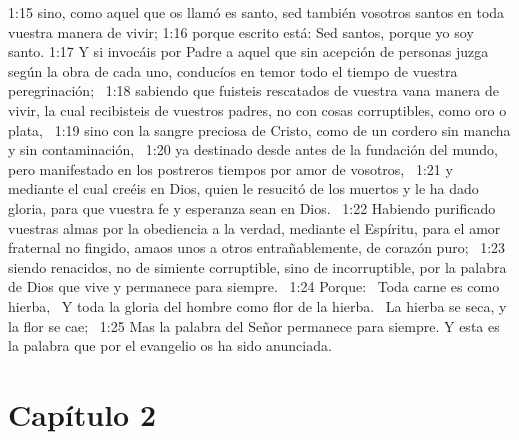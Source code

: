 1:15 sino, como aquel que os llamó es santo, sed también vosotros santos en toda vuestra manera de vivir; 
1:16 porque escrito está: Sed santos, porque yo soy santo. 
1:17 Y si invocáis por Padre a aquel que sin acepción de personas juzga según la obra de cada uno, conducíos en temor todo el tiempo de vuestra peregrinación;  
1:18 sabiendo que fuisteis rescatados de vuestra vana manera de vivir, la cual recibisteis de vuestros padres, no con cosas corruptibles, como oro o plata,  
1:19 sino con la sangre preciosa de Cristo, como de un cordero sin mancha y sin contaminación,  
1:20 ya destinado desde antes de la fundación del mundo, pero manifestado en los postreros tiempos por amor de vosotros,  
1:21 y mediante el cual creéis en Dios, quien le resucitó de los muertos y le ha dado gloria, para que vuestra fe y esperanza sean en Dios.  
1:22 Habiendo purificado vuestras almas por la obediencia a la verdad, mediante el Espíritu, para el amor fraternal no fingido, amaos unos a otros entrañablemente, de corazón puro;  
1:23 siendo renacidos, no de simiente corruptible, sino de incorruptible, por la palabra de Dios que vive y permanece para siempre.  
1:24 Porque:  
Toda carne es como hierba,  
Y toda la gloria del hombre como flor de la hierba.  
La hierba se seca, y la flor se cae;  
1:25 Mas la palabra del Señor permanece para siempre. 
Y esta es la palabra que por el evangelio os ha sido anunciada.  
\section*{Capítulo 2 }

